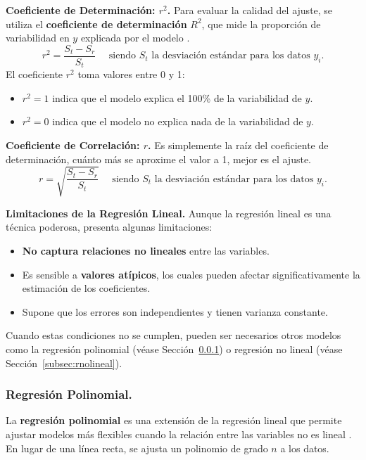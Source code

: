 \documentclass{article}
\begin{document}
\noindent \textbf{Coeficiente de Determinación: $r^2$.}
Para evaluar la calidad del ajuste, se utiliza el \textbf{coeficiente de determinación} $R^2$, que mide la proporción de variabilidad en $y$ explicada por el modelo \cite{polinomico4}.
\begin{equation}
    r^2 = \frac{S_t -S_r}{S_t} \quad \text{ siendo } S_t \text{ la desviación  estándar para los datos } y_i.
\end{equation}
El coeficiente $r^2$ toma valores entre 0 y 1:
\begin{itemize}
    \item $r^2 = 1$ indica que el modelo explica el 100\% de la variabilidad de $y$.
    \item $r^2 = 0$ indica que el modelo no explica nada de la variabilidad de $ y $.
\end{itemize}
\noindent \textbf{Coeficiente de Correlación: $r$.} Es simplemente la raíz del coeficiente de determinación, cuánto más se aproxime el valor a 1, mejor es
el ajuste.
\begin{equation}
    r = \sqrt{\frac{S_t -S_r}{S_t}} \quad \text{ siendo } S_t \text{ la desviación  estándar para los datos } y_i.
\end{equation}

\noindent\textbf{Limitaciones de la Regresión Lineal.} Aunque la regresión lineal es una técnica poderosa, presenta algunas limitaciones:

\begin{itemize}
    \item \textbf{No captura relaciones no lineales} entre las variables.
    \item Es sensible a \textbf{valores atípicos}, los cuales pueden afectar significativamente la estimación de los coeficientes.
    \item Supone que los errores son independientes y tienen varianza constante.
\end{itemize}

Cuando estas condiciones no se cumplen, pueden ser necesarios otros modelos como la regresión polinomial (véase Sección~\ref{subsec:rpolinomial}) o regresión no lineal (véase Sección~\ref{subsec:rnolineal}).

\newpage
\subsubsection{Regresión Polinomial.}
\label{subsec:rpolinomial}
La \textbf{regresión polinomial} es una extensión de la regresión lineal que permite ajustar modelos más flexibles cuando la relación entre las variables no es lineal \cite{polinomico1, polinomico5}. En lugar de una línea recta, se ajusta un polinomio de grado $n$ a los datos.\\
\end{document}
